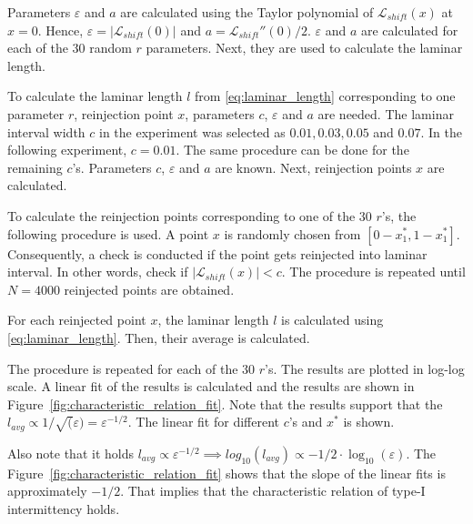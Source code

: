 Parameters $\varepsilon$ and $a$ are calculated using the Taylor polynomial of $\mathcal{L}_{shift}(x)$ at $x = 0$.
Hence, $\varepsilon = | \mathcal{L}_{shift}(0) |$ and $a = \mathcal{L}_{shift}''(0) / 2$.
$\varepsilon$ and $a$ are calculated for each of the $30$ random $r$ parameters.
Next, they are used to calculate the laminar length.
\par
To calculate the laminar length $l$ from \eqref{eq:laminar_length} corresponding to one parameter $r$, reinjection point $x$, parameters $c$, $\varepsilon$ and $a$ are needed.
The laminar interval width $c$ in the experiment was selected as $0.01, 0.03, 0.05$ and $0.07$.
In the following experiment, $c = 0.01$.
The same procedure can be done for the remaining $c$'s.
Parameters $c$, $\varepsilon$ and $a$ are known.
Next, reinjection points $x$ are calculated.
\par
To calculate the reinjection points corresponding to one of the $30$ $r$'s, the following procedure is used.
A point $x$ is randomly chosen from $[ 0-x^{*}_{1}, 1-x^{*}_{1} ]$.
Consequently, a check is conducted if the point gets reinjected into laminar interval.
In other words, check if $| \mathcal{L}_{shift}(x) | < c$.
The procedure is repeated until $N = 4000$ reinjected points are obtained.
\par
For each reinjected point $x$, the laminar length $l$ is calculated using \eqref{eq:laminar_length}.
Then, their average is calculated.
\par
The procedure is repeated for each of the $30$ $r$'s.
The results are plotted in log-log scale.
A linear fit of the results is calculated and the results are shown in Figure~\ref{fig:characteristic_relation_fit}.
Note that the results support that the $l_{avg} \propto 1/\sqrt(\varepsilon) = \varepsilon ^ {-1/2}$.
The linear fit for different $c$'s and $x^{*}$ is shown.
\par
Also note that it holds $l_{avg} \propto \varepsilon ^ {-1/2} \implies log_{10}(l_{avg}) \propto -1/2 \cdot \log_{10}(\varepsilon)$.
The Figure~\ref{fig:characteristic_relation_fit} shows that the slope of the linear fits is approximately $-1/2$.
That implies that the characteristic relation of type-I intermittency holds. 

